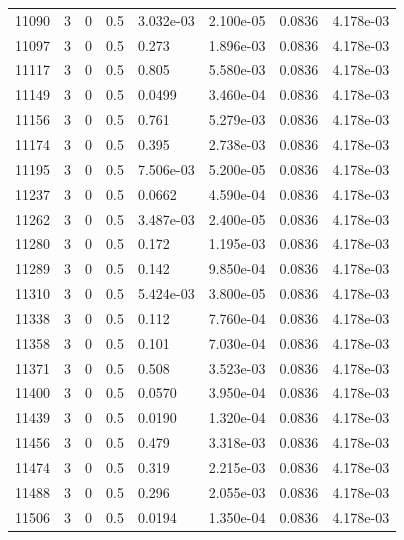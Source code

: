 \documentclass[preview]{standalone}
\begin{document}
{{{{{{{{{{{{\begin{tabular}{L{1.2cm}C{1.2cm} C{0.3cm}C{0.5cm} C{1.4cm}C{1.4cm} C{1.4cm}C{1.4cm}}
  11090  &     3  & 0     & 0.5 &  3.032e-03  & 2.100e-05  & 0.0836 &  4.178e-03   \\ 
  11097  &     3  & 0     & 0.5 &  0.273  & 1.896e-03  & 0.0836 &  4.178e-03   \\ 
  11117  &     3  & 0     & 0.5 &  0.805  & 5.580e-03  & 0.0836 &  4.178e-03   \\ 
  11149  &     3  & 0     & 0.5 &  0.0499  & 3.460e-04  & 0.0836 &  4.178e-03   \\ 
  11156  &     3  & 0     & 0.5 &  0.761  & 5.279e-03  & 0.0836 &  4.178e-03   \\ 
  11174  &     3  & 0     & 0.5 &  0.395  & 2.738e-03  & 0.0836 &  4.178e-03   \\ 
  11195  &     3  & 0     & 0.5 &  7.506e-03  & 5.200e-05  & 0.0836 &  4.178e-03   \\ 
  11237  &     3  & 0     & 0.5 &  0.0662  & 4.590e-04  & 0.0836 &  4.178e-03   \\ 
  11262  &     3  & 0     & 0.5 &  3.487e-03  & 2.400e-05  & 0.0836 &  4.178e-03   \\ 
  11280  &     3  & 0     & 0.5 &  0.172  & 1.195e-03  & 0.0836 &  4.178e-03   \\ 
  11289  &     3  & 0     & 0.5 &  0.142  & 9.850e-04  & 0.0836 &  4.178e-03   \\ 
  11310  &     3  & 0     & 0.5 &  5.424e-03  & 3.800e-05  & 0.0836 &  4.178e-03   \\ 
  11338  &     3  & 0     & 0.5 &  0.112  & 7.760e-04  & 0.0836 &  4.178e-03   \\ 
  11358  &     3  & 0     & 0.5 &  0.101  & 7.030e-04  & 0.0836 &  4.178e-03   \\ 
  11371  &     3  & 0     & 0.5 &  0.508  & 3.523e-03  & 0.0836 &  4.178e-03   \\ 
  11400  &     3  & 0     & 0.5 &  0.0570  & 3.950e-04  & 0.0836 &  4.178e-03   \\ 
  11439  &     3  & 0     & 0.5 &  0.0190  & 1.320e-04  & 0.0836 &  4.178e-03   \\ 
  11456  &     3  & 0     & 0.5 &  0.479  & 3.318e-03  & 0.0836 &  4.178e-03   \\ 
  11474  &     3  & 0     & 0.5 &  0.319  & 2.215e-03  & 0.0836 &  4.178e-03   \\ 
  11488  &     3  & 0     & 0.5 &  0.296  & 2.055e-03  & 0.0836 &  4.178e-03   \\ 
  11506  &     3  & 0     & 0.5 &  0.0194  & 1.350e-04  & 0.0836 &  4.178e-03   \\ 

\end{tabular}}}}}}}}}}}}}
\end{document}
